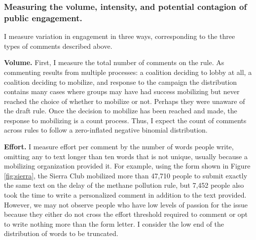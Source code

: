 
% 





\subsubsection{Measuring the volume, intensity, and potential contagion of public engagement.}

I measure variation in engagement in three ways, corresponding to the three types of comments described above. 

\textbf{Volume.} 
First, I measure the total number of comments on the rule. As commenting results from multiple processes: a coalition deciding to lobby at all, a coalition deciding to mobilize, and response to the campaign the distribution contains many cases where groups may have had success mobilizing but never reached the choice of whether to mobilize or not. Perhaps they were unaware of the draft rule. Once the decision to mobilize has been reached and made, the response to mobilizing is a count process. Thus, I expect the count of comments across rules to follow a zero-inflated negative binomial distribution. %

\textbf{Effort.} I measure effort per comment by the number of words people write, omitting any to text longer than ten words that is not unique, usually because a mobilizing organization provided it. %
For example, using the form shown in Figure \ref{fig:sierra}, the Sierra Club mobilized more than 47,710 people to submit exactly the same text on the delay of the methane pollution rule, but 7,452 people also took the time to write a personalized comment in addition to the text provided. However, we may not observe people who have low levels of passion for the issue because they either do not cross the effort threshold required to comment or opt to write nothing more than the form letter. I consider the low end of the distribution of words to be truncated.


